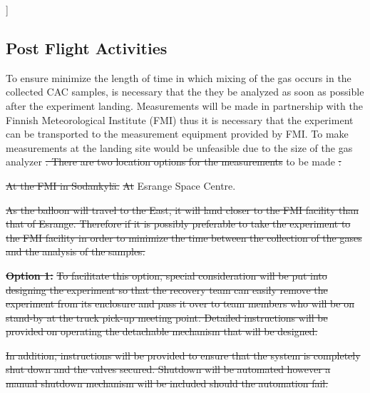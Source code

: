 ]\documentclass[a4paper,12pt,twoside]{article}
\providecommand{\DIFaddtex}[1]{{\protect\color{blue}\uwave{#1}}} %
\providecommand{\DIFdeltex}[1]{{\protect\color{red}\sout{#1}}}                      %
\providecommand{\DIFaddbegin}{} %
\providecommand{\DIFaddend}{} %
\providecommand{\DIFdelbegin}{} %
\providecommand{\DIFdelend}{} %
\providecommand{\DIFadd}[1]{\texorpdfstring{\DIFaddtex{#1}}{#1}} %
\providecommand{\DIFdel}[1]{\texorpdfstring{\DIFdeltex{#1}}{}} %
\newcommand{\DIFscaledelfig}{0.5}
\newlength{\DIFdelgraphicswidth} %
\newlength{\DIFdelgraphicsheight} %
\newcommand{\DIFaddincludegraphics}[2][]{{\color{blue}\fbox{\DIFOincludegraphics[#1]{#2}}}} %
\newcommand{\DIFdelincludegraphics}[2][]{%
\sbox{\DIFdelgraphicsbox}{\DIFOincludegraphics[#1]{#2}}%
\settoboxwidth{\DIFdelgraphicswidth}{\DIFdelgraphicsbox} %
\settoboxtotalheight{\DIFdelgraphicsheight}{\DIFdelgraphicsbox} %
\scalebox{\DIFscaledelfig}{%
\parbox[b]{\DIFdelgraphicswidth}{\usebox{\DIFdelgraphicsbox}\\[-\baselineskip] \rule{\DIFdelgraphicswidth}{0em}}\llap{\resizebox{\DIFdelgraphicswidth}{\DIFdelgraphicsheight}{%
\setlength{\unitlength}{\DIFdelgraphicswidth}%
\begin{picture}(1,1)%
\thicklines\linethickness{2pt} %
{\color[rgb]{1,0,0}\put(0,0){\framebox(1,1){}}}%
{\color[rgb]{1,0,0}\put(0,0){\line( 1,1){1}}}%
{\color[rgb]{1,0,0}\put(0,1){\line(1,-1){1}}}%
\end{picture}%
}\hspace*{3pt}}} %
} %
\DeclareRobustCommand{\DIFaddbegin}{\DIFOaddbegin \let\includegraphics\DIFaddincludegraphics} %
\DeclareRobustCommand{\DIFaddend}{\DIFOaddend \let\includegraphics\DIFOincludegraphics} %
\DeclareRobustCommand{\DIFdelbegin}{\DIFOdelbegin \let\includegraphics\DIFdelincludegraphics} %
\DeclareRobustCommand{\DIFdelend}{\DIFOaddend \let\includegraphics\DIFOincludegraphics} %
\begin{document}
\subsection{Post Flight Activities}

To ensure minimize the length of time in which mixing of the gas occurs in the collected CAC samples, is necessary that the they  be analyzed as soon as possible after the experiment landing. Measurements will be made in partnership with the Finnish Meteorological Institute (FMI) thus it is necessary that the experiment can be transported to the measurement equipment provided by FMI. To make measurements at the landing site would be unfeasible due to the size of the gas analyzer \DIFdelbegin \DIFdel{. There are two location options for the measurements }\DIFdelend \DIFaddbegin \DIFadd{hence measurements are }\DIFaddend to be made \DIFdelbegin \DIFdel{:
}%

\DIFdel{At the FMI in Sodankylä.
    }%
\DIFdel{At }\DIFdelend \DIFaddbegin \DIFadd{at the }\DIFaddend Esrange Space Centre.
\DIFdelbegin %
\DIFdelend 

\DIFdelbegin \DIFdel{As the balloon will travel to the East, it will land closer to the FMI facility than that of Esrange. Therefore if it is possibly preferable to take the experiment to the FMI facility in order to minimize the time between the collection of the gases and the analysis of the samples. 
}%

\textbf{\DIFdel{Option 1:}}
\DIFdel{To facilitate this option, special consideration will be put into designing the experiment so that the recovery team can easily remove the experiment from its enclosure and pass it over to team members who will be on stand-by at the truck pick-up meeting point. Detailed instructions will be provided on operating the detachable mechanism that will be designed. 
}%

\DIFdel{In addition, instructions will be provided to ensure that the system is completely shut down and the valves secured. Shutdown will be automated however a manual shutdown mechanism will be included should the automation fail.
}%
\end{document}
